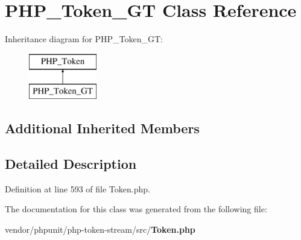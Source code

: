 \section{P\+H\+P\+\_\+\+Token\+\_\+\+G\+T Class Reference}
\label{class_p_h_p___token___g_t}
Inheritance diagram for P\+H\+P\+\_\+\+Token\+\_\+\+G\+T\+:\begin{figure}[H]
\begin{center}
\leavevmode
\includegraphics[height=2.000000cm]{class_p_h_p___token___g_t}
\end{center}
\end{figure}
\subsection*{Additional Inherited Members}


\subsection{Detailed Description}


Definition at line 593 of file Token.\+php.



The documentation for this class was generated from the following file\+:\begin{DoxyCompactItemize}
\item 
vendor/phpunit/php-\/token-\/stream/src/{\bf Token.\+php}\end{DoxyCompactItemize}
